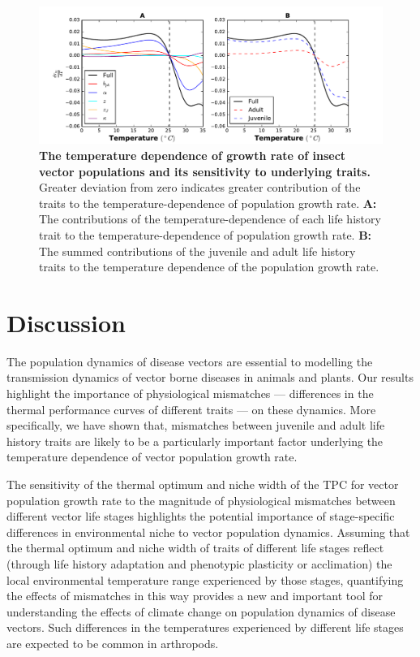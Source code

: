\begin{figure}[H] 
	\centering
	\includegraphics[width = .8\textwidth]{results/r_sens1.pdf}
	\caption{{\bf The temperature dependence of growth rate of insect vector populations and its sensitivity to underlying traits.} Greater deviation from zero indicates greater contribution of the traits to the temperature-dependence of population growth rate.
	{\bf A:} The contributions of the temperature-dependence of each life history trait to the temperature-dependence of population growth rate.
	{\bf B:} The summed contributions of the juvenile and adult life history traits to the temperature dependence of the population growth rate.}
\label{fig:r_sens}
\end{figure} 


\section*{Discussion}

The population dynamics of disease vectors are essential to modelling the transmission dynamics of vector borne diseases in animals and plants. Our results highlight the importance of physiological mismatches --- differences in the thermal performance curves of different traits --- on these dynamics. More specifically, we have shown that, mismatches between juvenile and adult life history traits are likely to be a particularly important factor underlying the temperature dependence of vector population growth rate. 

The sensitivity of the thermal optimum and niche width of the TPC for vector population growth rate to the magnitude of physiological mismatches between different vector life stages highlights the potential importance of stage-specific differences in environmental niche to vector population dynamics. Assuming that the thermal optimum and niche width of traits of different life stages reflect (through life history adaptation and phenotypic plasticity or acclimation) the local environmental temperature range experienced by those stages, quantifying the effects of mismatches in this way provides a new and important tool for understanding the effects of climate change on population dynamics of disease vectors. Such differences in the temperatures experienced by different life stages are expected to be common in arthropods. 

